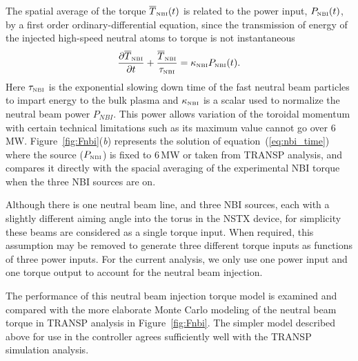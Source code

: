 \documentclass[12pt]{iopart}
\begin{document}
The spatial average of the torque $\overline{T}_\textrm{\tiny{NBI}}(t)$ is related to the power input, $P_\textrm{\tiny{NBI}}(t)$, by a first order ordinary-differential equation, since the transmission of energy of the injected high-speed neutral atoms to torque is not instantaneous
\begin{equation}
   \frac{\partial \overline{T}_\textrm{\tiny{NBI}}}{\partial t}
   + \frac{\overline{T}_\textrm{\tiny{NBI}}}{\tau_\textrm{\tiny{NBI}}}  = \kappa_\textrm{\tiny{NBI}} P_\textrm{\tiny{NBI}}(t).
   \label{eq:nbi_time}
\end{equation}
Here $\tau_\textrm{\tiny{NBI}}$ is the exponential slowing down time of the fast neutral beam particles to impart energy to the bulk plasma and $\kappa_\textrm{\tiny{NBI}}$ is a scalar used to normalize the neutral beam power $P_{NBI}$.  
This  power allows variation of the toroidal momentum with certain  technical limitations such as its maximum value cannot go over 6\,MW.
Figure~\ref{fig:Fnbi}(\emph{b}) represents the solution of equation~(\ref{eq:nbi_time}) where the source ($P_\textrm{\tiny{NBI}}$) is fixed to 6\,MW or taken from TRANSP analysis, and compares it directly with the spacial averaging of the experimental NBI torque when the three NBI sources are on.

Although there is one neutral beam line, and three NBI sources, each with a slightly different aiming angle into the torus in the NSTX device, for simplicity these beams are considered as a single torque input.  When required, this assumption may be removed to generate three different torque inputs as functions of three power inputs.  For the current analysis, we only use one power input and one torque output to account for the neutral beam injection.

The performance of this neutral beam injection torque model is examined and compared with the more elaborate Monte Carlo modeling of the neutral beam torque in TRANSP analysis in Figure~\ref{fig:Fnbi}. The simpler model described above for use in the controller agrees sufficiently well with the TRANSP simulation analysis.
\end{document}
